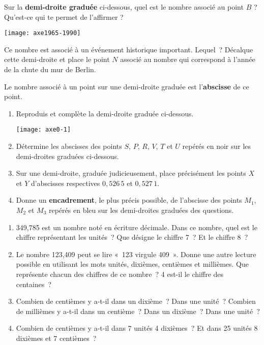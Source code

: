 \begin{activite}

\begin{partie}
Sur la \textbf{demi-droite graduée} ci-dessous, quel est le nombre associé au point $B$ ? Qu'est-ce qui te permet de l'affirmer ?

\texttt{[image: axe1965-1990]}

Ce nombre est associé à un événement historique important. Lequel ?
Décalque cette demi-droite et place le point $N$ associé au nombre qui correspond à l'année de la chute du mur de Berlin.

Le nombre associé à un point sur une demi-droite graduée est l'\textbf{abscisse} de ce point.

\end{partie}

\begin{partie}
\begin{enumerate}
 \item Reproduis et complète la demi-droite graduée ci-dessous.
 
 \texttt{[image: axe0-1]}
 
 \item Détermine les abscisses des points $S$, $P$, $R$, $V$, $T$ et $U$ repérés en noir sur les demi-droites graduées ci-dessous.
 \item Sur une demi-droite, graduée judicieusement, place précisément les points $X$ et $Y$ d'abscisses respectives $0,526\,5$ et $0,527\,1$.
 \item Donne un \textbf{encadrement}, le plus précis possible, de l'abscisse des points $M_1$, $M_2$ et $M_3$ repérés en bleu sur les demi-droites graduées des questions.
 \end{enumerate}
\end{partie}

\end{activite}




\begin{activite}
\begin{enumerate}
 \item 349,785 est un nombre noté en écriture décimale. Dans ce nombre, quel est le chiffre représentant les unités ? Que désigne le chiffre 7 ? Et le chiffre 8 ?
 \item Le nombre 123,409 peut se lire « 123 virgule 409 ». Donne une autre lecture possible en utilisant les mots unités, dixièmes, centièmes et millièmes.
Que représente chacun des chiffres de ce nombre ? 4 est-il le chiffre des centaines ?
 \item Combien de centièmes y a-t-il dans un  dixième ? Dans une  unité ?
Combien de millièmes y a-t-il dans un centième ? Dans un dixième ? Dans une unité ?
 \item Combien de centièmes y a-t-il dans 7 unités 4 dixièmes ? Et dans 25 unités 8 dixièmes et 7 centièmes ?
 \end{enumerate}
\end{activite}


